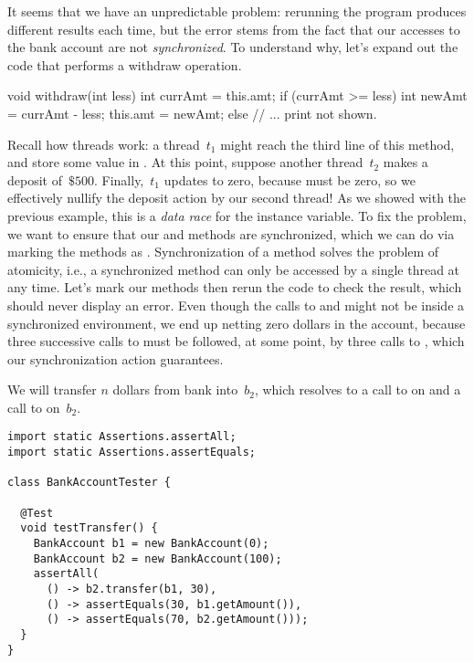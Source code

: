 It seems that we have an unpredictable problem: rerunning the program produces different results each time, but the error stems from the fact that our accesses to the bank account are not \emph{synchronized}. 
To understand why, let's expand out the code that performs a withdraw operation.

\begin{verbnobox}[\small]
void withdraw(int less) {
  int currAmt = this.amt;
  if (currAmt >= less) {
    int newAmt = currAmt - less;
    this.amt = newAmt;
  } else {
    // ... print not shown.
  }
}
\end{verbnobox}

\noindent Recall how threads work: a thread~$t_1$ might reach the third line of this method, and store some value in . 
At this point, suppose another thread~$t_2$ makes a deposit of~$\$500$. 
Finally,~$t_1$ updates  to zero, because  must be zero, so we effectively nullify the deposit action by our second thread! 
As we showed with the previous example, this is a \emph{data race} for the  instance variable. 
To fix the problem, we want to ensure that our  and  methods are synchronized, which we can do via marking the methods as . 
Synchronization of a method solves the problem of atomicity, i.e., a synchronized method can only be accessed by a single thread at any time. 
Let's mark our methods then rerun the code to check the result, which should never display an error. 
Even though the calls to  and  might not be inside a synchronized environment, we end up netting zero dollars in the account, because three successive calls to  must be followed, at some point, by three calls to , which our synchronization action guarantees.

We will transfer $n$ dollars from  bank into~$b_2$, which resolves to a call to  on  and a call to  on~$b_2$.

\begin{lstlisting}[language=MyJava]
import static Assertions.assertAll;
import static Assertions.assertEquals;

class BankAccountTester {

  @Test
  void testTransfer() {
    BankAccount b1 = new BankAccount(0);
    BankAccount b2 = new BankAccount(100);
    assertAll(
      () -> b2.transfer(b1, 30),
      () -> assertEquals(30, b1.getAmount()),
      () -> assertEquals(70, b2.getAmount()));
  }
}
\end{lstlisting}

